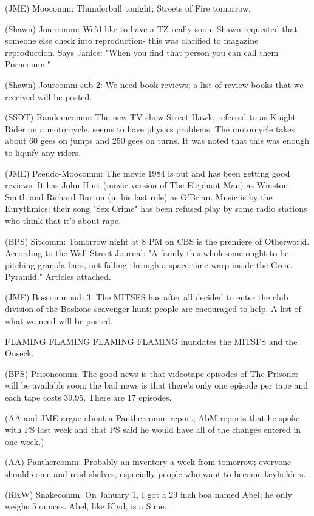 \documentclass[12pt]{article}
\begin{document}
(JME) Moocomm: Thunderball tonight; Streets of Fire tomorrow.

(Shawn) Jourcomm: We'd like to have a TZ really soon; Shawn requested that someone else check into reproduction- this was clarified to magazine reproduction. Says Janice: "When you find that person you can call them Porncomm."

(Shawn) Jourcomm sub 2: We need book reviews; a list of review books that we received will be posted.

(SSDT) Randomcomm: The new TV show Street Hawk, referred to as Knight Rider on a motorcycle, seems to have physics problems. The motorcycle takes about 60 gees on jumps and 250 gees on turns. It was noted that this was enough to liquify any riders.

(JME) Pseudo-Moocomm: The movie 1984 is out and has been getting good reviews. It has John Hurt (movie version of The Elephant Man) as Winston Smith and Richard Burton (in his last role) as O'Brian. Music is by the Eurythmics; their song "Sex Crime" has been refused play by some radio stations who think that it's about rape.

(BPS) Sitcomm: Tomorrow night at 8 PM on CBS is the premiere of Otherworld. According to the Wall Street Journal: "A family this wholesome ought to be pitching granola bars, not falling through a space-time warp inside the Great Pyramid." Articles attached.

(JME) Boscomm sub 3: The MITSFS has after all decided to enter the club division of the Boskone scavenger hunt; people are encouraged to help. A list of what we need will be posted.

FLAMING FLAMING FLAMING FLAMING inundates the MITSFS and the Onseck.

(BPS) Prisoncomm: The good news is that videotape episodes of The Prisoner will be available soon; the bad news is that there's only one episode per tape and each tape costs 39.95. There are 17 episodes.

(AA and JME argue about a Panthercomm report; AbM reports that he spoke with PS last week and that PS said he would have all of the changes entered in one week.)

(AA) Panthercomm: Probably an inventory a week from tomorrow; everyone should come and read shelves, especially people who want to become keyholders.

(RKW) Snakecomm: On January 1, I got a 29 inch boa named Abel; he only weighs 5 ounces. Abel, like Klyd, is a Sime.
\end{document}
